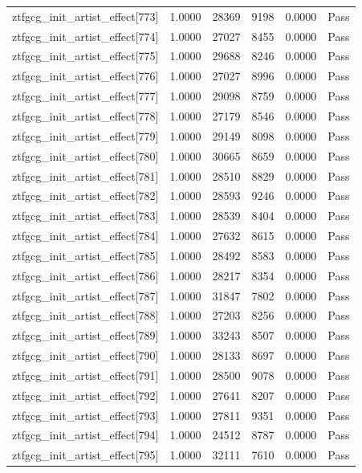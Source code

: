 \begin{table}[htbp]
\begin{tabular}{llrrll}
ztfgcg\_init\_artist\_effect[773] & 1.0000 & 28369 & 9198 & 0.0000 & Pass \\
ztfgcg\_init\_artist\_effect[774] & 1.0000 & 27027 & 8455 & 0.0000 & Pass \\
ztfgcg\_init\_artist\_effect[775] & 1.0000 & 29688 & 8246 & 0.0000 & Pass \\
ztfgcg\_init\_artist\_effect[776] & 1.0000 & 27027 & 8996 & 0.0000 & Pass \\
ztfgcg\_init\_artist\_effect[777] & 1.0000 & 29098 & 8759 & 0.0000 & Pass \\
ztfgcg\_init\_artist\_effect[778] & 1.0000 & 27179 & 8546 & 0.0000 & Pass \\
ztfgcg\_init\_artist\_effect[779] & 1.0000 & 29149 & 8098 & 0.0000 & Pass \\
ztfgcg\_init\_artist\_effect[780] & 1.0000 & 30665 & 8659 & 0.0000 & Pass \\
ztfgcg\_init\_artist\_effect[781] & 1.0000 & 28510 & 8829 & 0.0000 & Pass \\
ztfgcg\_init\_artist\_effect[782] & 1.0000 & 28593 & 9246 & 0.0000 & Pass \\
ztfgcg\_init\_artist\_effect[783] & 1.0000 & 28539 & 8404 & 0.0000 & Pass \\
ztfgcg\_init\_artist\_effect[784] & 1.0000 & 27632 & 8615 & 0.0000 & Pass \\
ztfgcg\_init\_artist\_effect[785] & 1.0000 & 28492 & 8583 & 0.0000 & Pass \\
ztfgcg\_init\_artist\_effect[786] & 1.0000 & 28217 & 8354 & 0.0000 & Pass \\
ztfgcg\_init\_artist\_effect[787] & 1.0000 & 31847 & 7802 & 0.0000 & Pass \\
ztfgcg\_init\_artist\_effect[788] & 1.0000 & 27203 & 8256 & 0.0000 & Pass \\
ztfgcg\_init\_artist\_effect[789] & 1.0000 & 33243 & 8507 & 0.0000 & Pass \\
ztfgcg\_init\_artist\_effect[790] & 1.0000 & 28133 & 8697 & 0.0000 & Pass \\
ztfgcg\_init\_artist\_effect[791] & 1.0000 & 28500 & 9078 & 0.0000 & Pass \\
ztfgcg\_init\_artist\_effect[792] & 1.0000 & 27641 & 8207 & 0.0000 & Pass \\
ztfgcg\_init\_artist\_effect[793] & 1.0000 & 27811 & 9351 & 0.0000 & Pass \\
ztfgcg\_init\_artist\_effect[794] & 1.0000 & 24512 & 8787 & 0.0000 & Pass \\
ztfgcg\_init\_artist\_effect[795] & 1.0000 & 32111 & 7610 & 0.0000 & Pass \\

\end{tabular}
\end{table}
